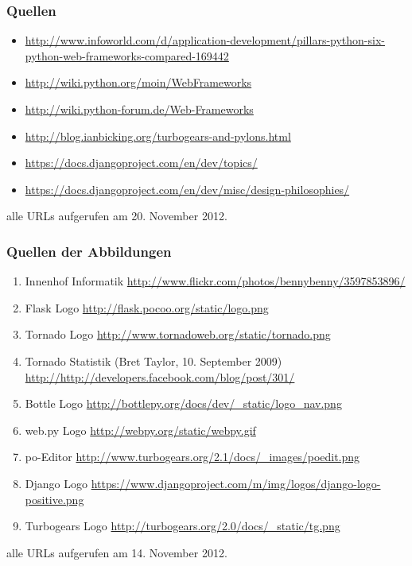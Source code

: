 \documentclass[
    t,
    smaller,
    compress,
    xcolor=svgnames,            %
    table,
]{beamer}
\begin{document}
\begin{frame}
  \frametitle{Quellen}

  {\footnotesize

  \begin{itemize}[<1->]
    \item \url{http://www.infoworld.com/d/application-development/pillars-python-six-python-web-frameworks-compared-169442}
    \item \url{http://wiki.python.org/moin/WebFrameworks}
    \item \url{http://wiki.python-forum.de/Web-Frameworks}
    \item \url{http://blog.ianbicking.org/turbogears-and-pylons.html}
    \item \url{https://docs.djangoproject.com/en/dev/topics/}
    \item \url{https://docs.djangoproject.com/en/dev/misc/design-philosophies/}
  \end{itemize}

  alle URLs aufgerufen am 20. November 2012.
  }
\end{frame}


\begin{frame}
  \frametitle{Quellen der Abbildungen}
  \footnotesize
  \begin{enumerate}[<1->]
    \item Innenhof Informatik
        \url{http://www.flickr.com/photos/bennybenny/3597853896/}       \label{illu:1}

   \item Flask Logo
        \url{http://flask.pocoo.org/static/logo.png}                    \label{illu:3}

    \item Tornado Logo
                \url{http://www.tornadoweb.org/static/tornado.png}              \label{illu:4}

    \item Tornado Statistik (Bret Taylor, 10. September 2009)
        \url{http://http://developers.facebook.com/blog/post/301/}      \label{illu:5}

    \item Bottle Logo
        \url{http://bottlepy.org/docs/dev/_static/logo_nav.png}             \label{illu:6}

    \item web.py Logo
        \url{http://webpy.org/static/webpy.gif}             \label{illu:7}
     \item po-Editor
        \url{http://www.turbogears.org/2.1/docs/_images/poedit.png}     \label{illu:8}
\item Django Logo
        \url{https://www.djangoproject.com/m/img/logos/django-logo-positive.png  }
\label{illu:9}
\item Turbogears Logo
        \url{http://turbogears.org/2.0/docs/_static/tg.png}
\label{illu:10}
  \end{enumerate}
  alle URLs aufgerufen am 14. November 2012.
\end{frame}
\end{document}
